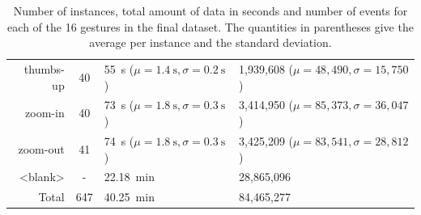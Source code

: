 \begin{table}
\begin{tabular}{r|c|l|l}
thumbs-up & 40 & \SI{55}{\second} (\(\mu = \SI{1.4}{\second}, \sigma = \SI{0.2}{\second}\)) & 1,939,608 (\(\mu = 48,490, \sigma = 15,750\))\\
zoom-in & 40 & \SI{73}{\second} (\(\mu = \SI{1.8}{\second}, \sigma = \SI{0.3}{\second}\)) & 3,414,950 (\(\mu = 85,373, \sigma = 36,047\))\\
zoom-out & 41 & \SI{74}{\second} (\(\mu = \SI{1.8}{\second}, \sigma = \SI{0.3}{\second}\)) & 3,425,209 (\(\mu = 83,541, \sigma = 28,812\))\\
<blank> & - & \SI{22.18}{\minute} & 28,865,096\\
\hline
Total & 647 & \SI{40.25}{\minute} & 84,465,277\\
  \end{tabular}
  \caption{Number of instances, total amount of data in seconds and number of
    events for each of the 16 gestures in the final dataset. The quantities in
    parentheses give the average per instance and the standard deviation.}
  \label{tab:dataset-stats}
\end{table}
